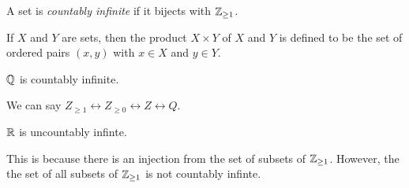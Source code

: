 \documentclass[a4paper]{article}
\begin{document}
\begin{defi}
A set is \emph{countably infinite} if it bijects with $\mathbb{Z}_{\geq 1}$.
\end{defi}

\begin{defi}
If $X$ and $Y$ are sets, then the product $X \times Y$ of $X$ and $Y$ is defined to be the set of ordered pairs $(x,y)$ with $x \in X$ and $y \in Y$.
\end{defi}

\begin{prop}
$\mathbb{Q}$ is countably infinite.
\end{prop}
We can say $Z_{\geq 1} \leftrightarrow Z_{\geq 0} \leftrightarrow Z \leftrightarrow Q$.

\begin{prop}
$\mathbb{R}$ is uncountably infinte.
\end{prop}
This is because there is an injection from the set of subsets of $\mathbb{Z}_{\geq 1}$. However, the the set of all subsets of $\mathbb{Z}_{\geq 1}$ is not countably infinte.
\end{document}
